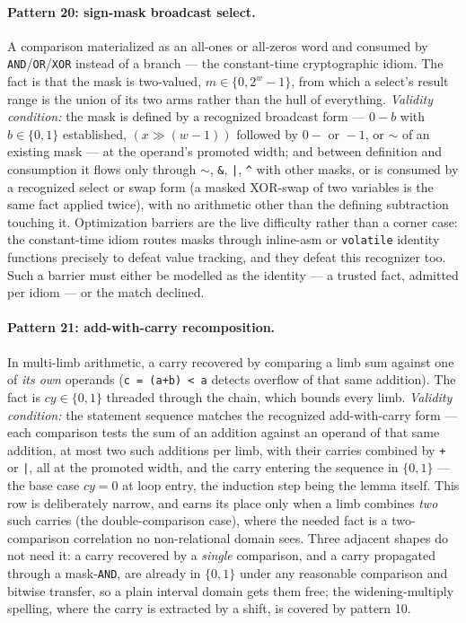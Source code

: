 \documentclass[11pt,a4paper]{article}
\begin{document}
\paragraph{Pattern 20: sign-mask broadcast select.} A comparison materialized as an
all-ones or all-zeros word and consumed by \texttt{AND}/\texttt{OR}/\texttt{XOR} instead
of a branch --- the constant-time cryptographic idiom. The fact is that the mask is
two-valued, $m \in \{0, 2^w{-}1\}$, from which a select's result range is the union of its
two arms rather than the hull of everything. \emph{Validity condition:} the mask is
defined by a recognized broadcast form --- $0 - b$ with $b \in \{0,1\}$ established,
$(x \gg (w{-}1))$ followed by $0-{}$ or ${}-1$, or $\sim$ of an existing mask --- at the
operand's promoted width; and between definition and consumption it flows only through
$\sim$, \texttt{\&}, \texttt{|}, \texttt{\textasciicircum} with other masks, or is consumed by a
recognized select or swap form (a masked XOR-swap of two variables is the same fact
applied twice), with no arithmetic other than the defining subtraction touching it. Optimization barriers are the live difficulty rather than a corner case: the
constant-time idiom routes masks through inline-asm or \texttt{volatile} identity
functions precisely to defeat value tracking, and they defeat this recognizer too. Such a
barrier must either be modelled as the identity --- a trusted fact, admitted per idiom ---
or the match declined.

\paragraph{Pattern 21: add-with-carry recomposition.} In multi-limb arithmetic, a carry
recovered by comparing a limb sum against one of \emph{its own} operands
(\texttt{c = (a+b) < a} detects overflow of that same addition). The fact is
$\mathit{cy} \in \{0,1\}$ threaded through the chain, which bounds every limb.
\emph{Validity condition:} the statement sequence matches the recognized
add-with-carry form --- each comparison tests the sum of an addition against an operand
of that same addition, at most two such additions per limb, with their carries combined
by \texttt{+} or \texttt{|}, all at the promoted width, and the carry entering the
sequence in $\{0,1\}$ --- the base case $\mathit{cy} = 0$ at loop entry, the induction step
being the lemma itself. This row is deliberately narrow, and earns its place only when a
limb combines \emph{two} such carries (the double-comparison case), where the needed fact
is a two-comparison correlation no non-relational domain sees. Three adjacent shapes do
not need it: a carry recovered by a
\emph{single} comparison, and a carry propagated through a mask-\texttt{AND}, are already
in $\{0,1\}$ under any reasonable comparison and bitwise transfer, so a plain interval
domain gets them free; the widening-multiply spelling, where the carry is extracted by a
shift, is covered by pattern 10.
\end{document}
